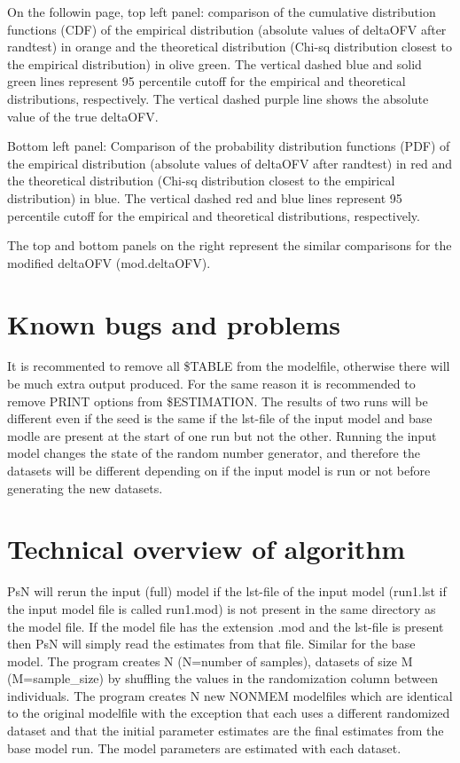On the followin page, top left panel: comparison of the cumulative distribution functions (CDF) 
of the empirical distribution (absolute values of deltaOFV after randtest) in 
orange and the theoretical distribution (Chi-sq distribution closest to the 
empirical distribution) in olive green. The vertical dashed blue and solid 
green lines represent 95 percentile cutoff for the empirical and theoretical 
distributions, respectively. The vertical dashed purple line shows the absolute
value of the true deltaOFV.

Bottom left panel: Comparison of the probability distribution functions (PDF) 
of the empirical distribution (absolute values of deltaOFV after randtest) in 
red and the theoretical distribution (Chi-sq distribution closest to the 
empirical distribution) in blue. The vertical dashed red and blue lines 
represent 95 percentile cutoff for the empirical and theoretical distributions,
respectively.

The top and bottom panels on the right represent the similar comparisons for 
the modified deltaOFV (mod.deltaOFV).


\section{Known bugs and problems}

It is recommented to remove all \$TABLE from the modelfile, otherwise there will be much extra output produced. For the same reason it is recommended to remove PRINT options from \$ESTIMATION. 
The results of two runs will be different even if the seed is the same if the lst-file of the input model and base modle are present at the start of one run but not the other. Running the input model changes the state of the random number generator, and therefore the datasets will be different depending on if the input model is run or not before generating the  new datasets.

\section{Technical overview of algorithm}

PsN will rerun the input (full) model if the lst-file of the input model (run1.lst if the input model file is called run1.mod) is not present in the same directory as the model file. 
If the model file has the extension .mod and the lst-file is present then PsN will simply read the estimates from that file. Similar for the base model.
The program creates N (N=number of samples), datasets of size M (M=sample\_size) by shuffling the values in the randomization column between individuals. The program creates N new NONMEM modelfiles which are identical to the original modelfile with the exception that each uses a different randomized dataset and that the initial parameter estimates are the final estimates from the base model run. The model parameters are estimated with each dataset.


